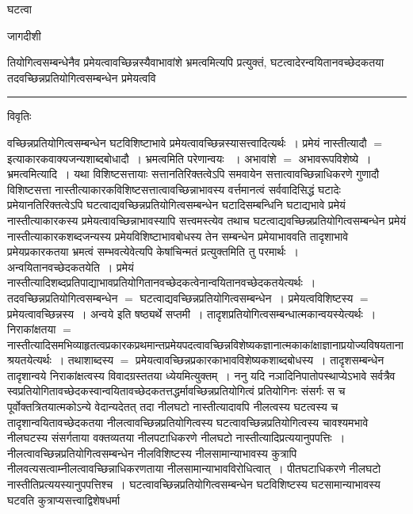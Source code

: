 \documentclass[10pt, openany]{book}
\begin{document}
{घटत्वा
\newpage
\begin{center} जागदीशी \end{center}
{\la तियोगित्वसम्बन्धेनैव प्रमेयत्वावच्छिन्नस्यैवाभावांशे भ्रमत्वमित्यपि
प्रत्युक्तं,
घटत्वादेरन्वयितानवच्छेदकतया तदवच्छिन्नप्रतियोगित्वसम्बन्धेन प्रमेयत्ववि}\\
\hrule
\begin{center}     विवृतिः \end{center}
वच्छिन्नप्रतियोगित्वसम्बन्धेन घटविशिष्टाभावे
प्रमेयत्वावच्छिन्नस्यासत्त्वादित्यर्थः~।
प्रमेयं नास्तीत्यादौ $=$ इत्याकारकवाक्यजन्यशाब्दबोधादौ~। भ्रमत्वमिति
परेणान्वयः~ । अभावांशे $=$ अभावरूपविशेष्ये~। भ्रमत्वमित्यादि~। यथा विशिष्टसत्तायाः सत्तानतिरिक्तत्वेऽपि समवायेन सत्तात्वावच्छिन्नाधिकरणे गुणादौ
विशिष्टसत्ता नास्तीत्याकारकविशिष्टसत्तात्वावच्छिन्नाभावस्य वर्त्तमानत्वं
सर्ववादिसिद्धं घटादेः प्रमेयानतिरिक्तत्वेऽपि
घटत्वाद्यवच्छिन्नप्रतियोगित्वसम्बन्धेन घटादिसम्बन्धिनि घटाद्यभावे प्रमेयं नास्तीत्याकारकस्य
प्रमेयत्वावच्छिन्नाभावस्यापि सत्त्वमस्त्येव तथाच घटत्वाद्यवच्छिन्नप्रतियोगित्वसम्बन्धेन
प्रमेयं नास्तीत्याकारकशब्दजन्यस्य प्रमेयविशिष्टाभावबोधस्य तेन सम्बन्धेन
प्रमेयाभाववति तादृशाभावे प्रमेयप्रकारकतया भ्रमत्वं सम्भवत्येवेत्यपि केषांचिन्मतं
प्रत्युक्तमिति तु परमार्थः~। {\qt अन्वयितानवच्छेदकतयेति}~। प्रमेयं
नास्तीत्यादिशब्दप्रतिपाद्याभावप्रतियोगितानवच्छेदकत्वेनान्वयितानवच्छेदकतयेत्यर्थः~।
तदवच्छिन्नप्रतियोगित्वसम्बन्धेन $=$ घटत्वाद्यवच्छिन्नप्रतियोगित्वसम्बन्धेन~। प्रमेयत्वविशिष्टस्य $=$ प्रमेयत्वावच्छिन्नस्य~। {\qt अन्वये} इति षष्ठ्यर्थे सप्तमी~। तादृशप्रतियोगित्वसम्बन्धात्मकान्वयस्येत्यर्थः~। निराकांक्षतया  $=$ 
नास्तीत्यादिसमभिव्याहृतत्वप्रकारकप्रथमान्तप्रमेयपदत्वावच्छिन्नविशेष्यकज्ञानात्मकाकांक्षाज्ञानाप्रयोज्यविषयतानाश्रयतयेत्यर्थः~।
तथाशाब्दस्य $=$ प्रमेयत्वावच्छिन्नप्रकारकाभावविशेष्यकशाब्दबोधस्य~। तादृशसम्बन्धेन तादृशान्वये निराकांक्षत्वस्य
विवादग्रस्ततया ध्येयमित्युक्तम्~। ननु यदि नञादिनिपातोपस्थाप्येऽभावे सर्वत्रैव
स्वप्रतियोगितावच्छेदकस्वान्वयितावच्छेदकतत्तद्धर्मावच्छिन्नप्रतियोगित्वं प्रतियोगिनः
संसर्गः
स च पूर्वोक्तत्रितयात्मकोऽन्ये वेदान्यदेतत् तदा नीलघटो नास्तीत्यादावपि
नीलत्वस्य घटत्वस्य च तादृशान्वयितावच्छेदकतया नीलत्वावच्छिन्नप्रतियोगित्वस्य
घटत्वावच्छिन्नप्रतियोगित्वस्य चावश्यमभावे नीलघटस्य संसर्गताया वक्तव्यतया
नीलपटाधिकरणे नीलघटो नास्तीत्यादिप्रत्ययानुपपत्तिः~।
नीलत्वावच्छिन्नप्रतियोगित्वसम्बन्धेन नीलविशिष्टस्य नीलसामान्याभावस्य कुत्रापि
नीलवत्यसत्वाम्नीलत्वावच्छिन्नाधिकरणताया नीलसामान्याभावविरोधित्वात्~। पीतघटाधिकरणे नीलघटो नास्तीतिप्रत्ययस्यानुपपत्तिश्च~।
घटत्वावच्छिन्नप्रतियोगित्वसम्बन्धेन घटविशिष्टस्य घटसामान्याभावस्य घटवति
कुत्राप्यसत्त्वाद्विशेषधर्मा
}
\end{document}
